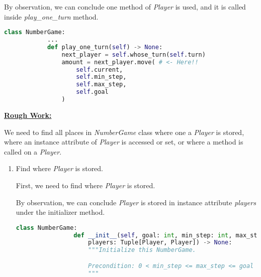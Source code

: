 \documentclass[12pt]{article}
\begin{document}
\begin{enumerate}[1.]
\begin{itemize}
        \bigskip

        By observation, we can conclude one method of \textit{Player}
        is used, and it is called inside \textit{play\_one\_turn} method.

        \bigskip

        \begin{lstlisting}[language=Python]
        class NumberGame:
            ...
            def play_one_turn(self) -> None:
                next_player = self.whose_turn(self.turn)
                amount = next_player.move( # <- Here!!
                    self.current,
                    self.min_step,
                    self.max_step,
                    self.goal
                )
        \end{lstlisting}

    \end{itemize}

    \begin{mdframed}
        \underline{\textbf{Rough Work:}}

        \bigskip

        We need to find all places in \textit{NumberGame} class where one a
        \textit{Player} is stored, where an instance attribute of \textit{Player}
        is accessed or set, or where a method is called on a \textit{Player}.

        \bigskip

        \begin{enumerate}[1.]
            \item Find where \textit{Player} is stored.

            \bigskip

            \begin{mdframed}

            First, we need to find where \textit{Player} is stored.

            \bigskip

            By observation, we can conclude \textit{Player} is stored in
            instance attribute \textit{players} under the initializer method.

            \begin{lstlisting}[language=Python]
            class NumberGame:
                def __init__(self, goal: int, min_step: int, max_step: int,
                    players: Tuple[Player, Player]) -> None:
                    """Initialize this NumberGame.

                    Precondition: 0 < min_step <= max_step <= goal
                    """


\end{lstlisting}
\end{mdframed}
\end{enumerate}
\end{mdframed}
\end{enumerate}
\end{document}
